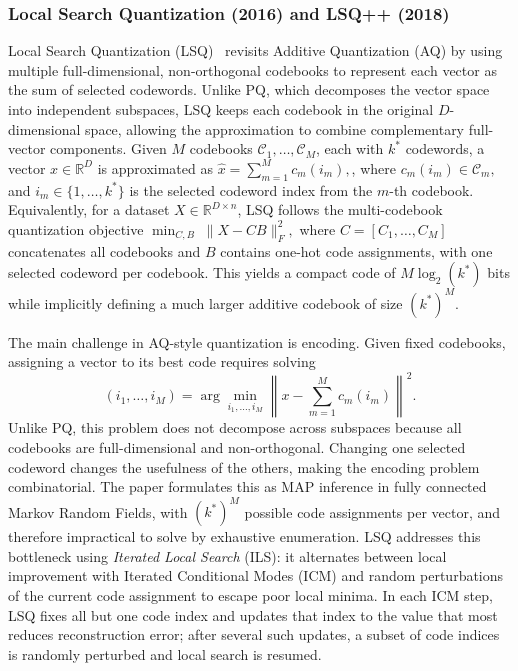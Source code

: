 \documentclass[sigconf]{acmart}
\begin{document}
\subsubsection{\textbf{Local Search Quantization (2016) and LSQ++ (2018)}} 
Local Search Quantization (LSQ)~\cite{lsq, lsq++} revisits Additive Quantization (AQ) by using multiple full-dimensional, non-orthogonal codebooks to represent each vector as the sum of selected codewords. 
Unlike PQ, which decomposes the vector space into independent subspaces, LSQ keeps each codebook in the original $D$-dimensional space, allowing the approximation to combine complementary full-vector components. 
Given $M$ codebooks $\mathcal{C}_1,\ldots,\mathcal{C}_M$, each with $k^{*}$ codewords, a vector $x \in \mathbb{R}^{D}$ is approximated as
\(
\hat{x}
=
\sum_{m=1}^{M} c_m(i_m),
\), where \(c_m(i_m) \in \mathcal{C}_m ,
\)
and $i_m \in \{1,\ldots,k^{*}\}$ is the selected codeword index from the $m$-th codebook. 
Equivalently, for a dataset $X \in \mathbb{R}^{D \times n}$, LSQ follows the multi-codebook quantization objective
\(
\min_{C,B} \; \|X-CB\|_F^2 ,
\)
where $C=[C_1,\ldots,C_M]$ concatenates all codebooks and $B$ contains one-hot code assignments, with one selected codeword per codebook. 
This yields a compact code of $M\log_2(k^{*})$ bits while implicitly defining a much larger additive codebook of size $(k^{*})^M$.

The main challenge in AQ-style quantization is encoding. 
Given fixed codebooks, assigning a vector to its best code requires solving
\[
(i_1,\ldots,i_M)
=
\arg\min_{i_1,\ldots,i_M}
\left\|
x-\sum_{m=1}^{M} c_m(i_m)
\right\|^2 .
\]
Unlike PQ, this problem does not decompose across subspaces because all codebooks are full-dimensional and non-orthogonal. 
Changing one selected codeword changes the usefulness of the others, making the encoding problem combinatorial. The paper formulates this as MAP inference in fully connected Markov Random Fields, with $(k^{*})^M$ possible code assignments per vector, and therefore impractical to solve by exhaustive enumeration. 
LSQ addresses this bottleneck using \emph{Iterated Local Search} (ILS): it alternates between local improvement with Iterated Conditional Modes (ICM) and random perturbations of the current code assignment to escape poor local minima. 
In each ICM step, LSQ fixes all but one code index and updates that index to the value that most reduces reconstruction error; after several such updates, a subset of code indices is randomly perturbed and local search is resumed.
\end{document}
